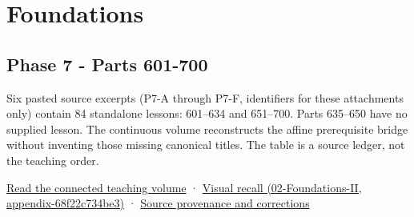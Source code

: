 \hypertarget{appendix-fd090d982a15}{}
\section{Foundations}\label{appendix-fd090d982a15-foundations}

\subsection{Phase 7 - Parts 601-700}\label{appendix-fd090d982a15-phase-7---parts-601-700}

Six pasted source excerpts (P7-A through P7-F, identifiers for these attachments only) contain 84 standalone lessons: 601--634 and 651--700. Parts 635--650 have no supplied lesson. The continuous volume reconstructs the affine prerequisite bridge without inventing those missing canonical titles. The table is a source ledger, not the teaching order.

\hyperref[01-foundations-i-ch018-keep-the-promises-visible-while-moving-between-representations]{Read the connected teaching volume} · \href{../02-Foundations-II/main.pdf\#nameddest=appendix-68f22c734be3}{Visual recall (02-Foundations-II, appendix-68f22c734be3)} · \hyperref[appendix-a103e7846d21-phase-7---source-analysis-and-verification]{Source provenance and corrections}

